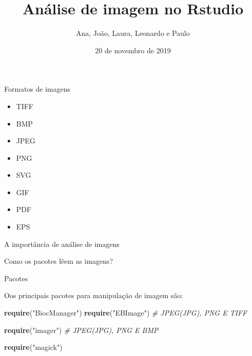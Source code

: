 \documentclass[
  ignorenonframetext,
]{beamer}
\title{Análise de imagem no Rstudio}
\author{Ana, João, Laura, Leonardo e Paulo}
\date{20 de novembro de 2019}
\newenvironment{Shaded}{\begin{snugshade}}{\end{snugshade}}
\newcommand{\CommentTok}[1]{\textcolor[rgb]{0.56,0.35,0.01}{\textit{#1}}}
\newcommand{\KeywordTok}[1]{\textcolor[rgb]{0.13,0.29,0.53}{\textbf{#1}}}
\newcommand{\NormalTok}[1]{#1}
\newcommand{\StringTok}[1]{\textcolor[rgb]{0.31,0.60,0.02}{#1}}
\begin{document}
\frame{\titlepage}

\begin{frame}{Formatos de imagens}
\protect\hypertarget{formatos-de-imagens}{}

\small

\begin{itemize}
    \item TIFF
    \item BMP
    \item JPEG
    \item PNG
    \item SVG
    \item GIF
    \item PDF
    \item EPS
\end{itemize}

\end{frame}

\begin{frame}{A importância de análise de imagens}
\protect\hypertarget{a-importuxe2ncia-de-anuxe1lise-de-imagens}{}

\small

\end{frame}

\begin{frame}{Como os pacotes lêem as imagens?}
\protect\hypertarget{como-os-pacotes-luxeaem-as-imagens}{}

\small

\end{frame}

\begin{frame}[fragile]{Pacotes}
\protect\hypertarget{pacotes}{}

\small

Oos principais pacotes para manipulação de imagem são:

\begin{Shaded}
\begin{Highlighting}[]
\KeywordTok{require}\NormalTok{(}\StringTok{"BiocManager"}\NormalTok{) }
\KeywordTok{require}\NormalTok{(}\StringTok{"EBImage"}\NormalTok{) }\CommentTok{# JPEG(JPG), PNG E TIFF}

\KeywordTok{require}\NormalTok{(}\StringTok{"imager"}\NormalTok{) }\CommentTok{# JPEG(JPG), PNG E BMP}

\KeywordTok{require}\NormalTok{(}\StringTok{"magick"}\NormalTok{) }
\end{Highlighting}
\end{Shaded}

\end{frame}
\end{document}
